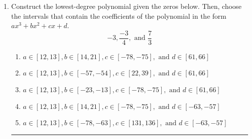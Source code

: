 \documentclass[14pt]{extbook}
\newcommand{\litem}[1]{\item#1\hspace*{-1cm}\rule{\textwidth}{0.4pt}}
\begin{document}
\begin{enumerate}
\litem{
Construct the lowest-degree polynomial given the zeros below. Then, choose the intervals that contain the coefficients of the polynomial in the form $ax^3+bx^2+cx+d$.\[ -3, \frac{-3}{4}, \text{ and } \frac{7}{3} \]\begin{enumerate}[label=\Alph*.]
\item \( a \in [12, 13], b \in [14, 21], c \in [-78, -75], \text{ and } d \in [61, 66] \)
\item \( a \in [12, 13], b \in [-57, -54], c \in [22, 39], \text{ and } d \in [61, 66] \)
\item \( a \in [12, 13], b \in [-23, -13], c \in [-78, -75], \text{ and } d \in [61, 66] \)
\item \( a \in [12, 13], b \in [14, 21], c \in [-78, -75], \text{ and } d \in [-63, -57] \)
\item \( a \in [12, 13], b \in [-78, -63], c \in [131, 136], \text{ and } d \in [-63, -57] \)


\end{enumerate}}
\end{enumerate}
\end{document}
